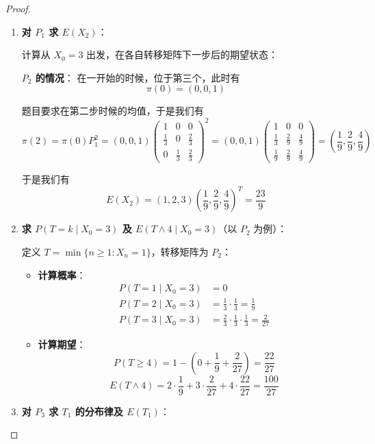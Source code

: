 \documentclass[lang=cn,10pt,thmcnt=section]{elegantbook}
\begin{document}
\begin{proof}
	\begin{enumerate}[label=(\arabic*)]
		\item \textbf{对 $P_1$ 求 $E(X_2)$}：
		
		  计算从 $X_0=3$ 出发，在各自转移矩阵下一步后的期望状态：
	
			 \textbf{$P_2$ 的情况}：
			  在一开始的时候，位于第三个，此时有
			\[
				\pi(0)=(0,0,1)
			\]
			
			题目要求在第二步时候的均值，于是我们有
			\[
				\pi(2)=\pi(0) P_1^2=(0,0,1)\begin{pmatrix}
					1 & 0 & 0 \\
					\frac{1}{3} & 0 & \frac{2}{3} \\
					0 & \frac{1}{3} & \frac{2}{3}
					\end{pmatrix}^2=(0,0,1)\begin{pmatrix}
						1 & 0 & 0 \\
						\frac{1}{3} & \frac{2}{9} & \frac{4}{9} \\
						\frac{1}{9} & \frac{2}{9} & \frac{4}{9}
						\end{pmatrix}=
					(\frac{1}{9},\frac{2}{9},\frac{4}{9})
			\]
			 
		于是我们有
		\[
			E(X_2)=(1,2,3)(\frac{1}{9},\frac{2}{9},\frac{4}{9})^T=\frac{23}{9}
		\]
		\item \textbf{求 $P(T = k \mid X_0 = 3)$ 及 $E(T \land 4 \mid X_0 = 3)$}（以 $P_2$ 为例）：
		  
		  定义 $T = \min\{n \geq 1: X_n = 1\}$，转移矩阵为 $P_2$：
		  \begin{itemize}
			\item \textbf{计算概率}：
			  \begin{align*}
				P(T=1 \mid X_0=3) &= 0 \\
				P(T=2 \mid X_0=3) &= \frac{1}{3} \cdot \frac{1}{3} = \frac{1}{9} \\
				P(T=3 \mid X_0=3) &= \frac{2}{3} \cdot \frac{1}{3} \cdot \frac{1}{3} = \frac{2}{27}
			  \end{align*}
			 
			
			\item \textbf{计算期望}：
			  \[
			  P(T \geq 4) = 1 - \left(0 + \frac{1}{9} + \frac{2}{27}\right) = \frac{22}{27}
			  \]
			  \[
			  E(T \land 4) = 2 \cdot \frac{1}{9} + 3 \cdot \frac{2}{27} + 4 \cdot \frac{22}{27} = \frac{100}{27}
			  \]			 
		  \end{itemize}
		
		\item \textbf{对 $P_3$ 求 $T_1$ 的分布律及 $E(T_1)$}：
		  

\end{enumerate}
\end{proof}
\end{document}
